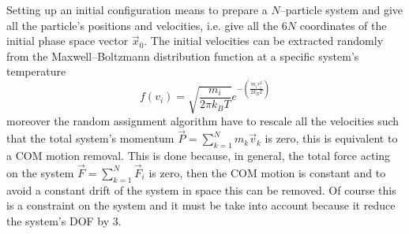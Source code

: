 Setting up an initial configuration means to prepare a $N$--particle system and give all the particle's positions and velocities, i.e. give all the $6N$ coordinates of the initial phase space vector $\vec x_0$. The initial velocities can be extracted randomly from the Maxwell--Boltzmann distribution function at a specific system's temperature
\begin{equation*}
	f(v_i) = \sqrt{\frac{m_i}{2\pi k_B T}}e^{-\left ( \frac{m_iv_i^2}{2k_B T}\right )}
\end{equation*}
moreover the random assignment algorithm have to rescale all the velocities such that the total system's momentum $\vec P = \sum_{k=1}^N m_k\vec v_k$ is zero, this is equivalent to a \ac{COM} motion removal. This is done because, in general, the total force acting on the system $\vec F = \sum_{k=1}^N \vec F_i$ is zero, then the \ac{COM} motion is constant and to avoid a constant drift of the system in space this can be removed. Of course this is a constraint on the system and it must be take into account because it reduce the system's \ac{DOF} by $3$.

